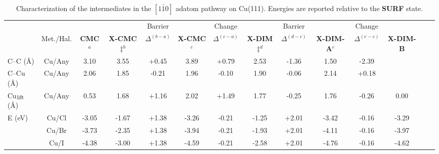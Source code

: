 \documentclass[aps,prl,reprint,amsmath,amssymb,floatfix,notitlepage]{revtex4-1}
\begin{document}
\begin{table}
\centering
\caption{Characterization of the intermediates in the $[1\bar{1}0]$ adatom pathway on Cu(111). Energies are reported relative to the \textbf{SURF} state.}
\label{table:adatom-110}
\begin{tabular}{ lccccccccccccc  }
 \hline
 \hline
 & & & & Barrier & & Change & & Barrier & &Change&\\
 & Met./Hal. & \textbf{CMC}$^{a}$ & \textbf{X-CMC$\ddagger$}$^{b}$ & $\Delta^{(b-a)}$ & \textbf{X-CMC}$^{c}$ &$\Delta^{(c-a)}$ & \textbf{X-DIM$\ddagger$}$^{d}$ & $\Delta^{(d-c)}$ & \textbf{X-DIM-A}$^{e}$ &$\Delta^{(e-c)}$ & \textbf{X-DIM-B}  \\ 
 \hline 
 {C--C (\si{\angstrom})} & Cu/Any & {3.10} & {3.55} & {+0.45} & {3.89} &{+0.79} & {2.53} &{-1.36} & {1.50} &{-2.39}\\ 
 \hline
 {C--Cu (\si{\angstrom}) } & Cu/Any & {2.06} & {1.85} & {-0.21} & {1.96} &{-0.10} & {1.90} &{-0.06} & {2.14} &{+0.18} &{} \\ 
 \hline
 {Cu$_{\rm lift}$ (\si{\angstrom}) } & Cu/Any & {0.53} & {1.68} & {+1.16} & {2.02} &{+1.49} & {1.77} & {-0.25} & {1.76} &{-0.26} &{0.00}\\ 
 \hline
 \multirow{3}{*}{E (\si{\electronvolt}) } & Cu/Cl & -3.05 &-1.67 & +1.38 &-3.26 &-0.21 & -1.25 & +2.01& -3.42&-0.16&-3.29 \\ 
 & Cu/Br &-3.73 &-2.35 &+1.38 & -3.94 &-0.21 & -1.93 & +2.01 & -4.11 & -0.16&-3.97 \\ 
 & Cu/I  & -4.38 & -3.00 & +1.38 & -4.59 &-0.21 & -2.58& +2.01 & -4.76 & -0.16&-4.62\\ 
 \hline
 \hline
\end{tabular}
\end{table}
\end{document}
